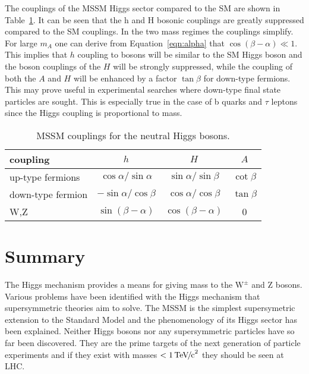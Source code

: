 The couplings of the MSSM Higgs sector compared to the SM are shown in Table~\ref{tab:MSSMcoupling}. It can be seen that the h and H bosonic couplings are greatly suppressed compared to the SM couplings. In the two mass regimes the couplings simplify. For large $m_{A}$ one can derive from Equation~\ref{eqn:alpha} that $\cos(\beta - \alpha) \ll 1$. This implies that $h$ coupling to bosons will be similar to the SM Higgs boson and the boson couplings of the $H$ will be strongly suppressed, while the coupling of both the $A$ and $H$ will be enhanced by a factor $\tan{\beta}$ for down-type fermions. This may prove useful in experimental searches where down-type final state particles are sought. This is especially true in the case of  b quarks and $\tau$ leptons since the Higgs coupling is proportional to mass.

\begin{table}[tbp]
	\centering
	\begin{tabular}{|l|c|c|c|}
	\hline
	coupling & $h$ & $H$ & $A$ \\ \hline
	up-type fermions & $\cos{\alpha} / \sin{\alpha}$ & $\sin{\alpha} / \sin{\beta}$ & $\cot{\beta}$ \\ \hline
	down-type fermion & $- \sin{\alpha} / \cos{\beta}$ & $\cos{\alpha} / \cos{\beta}$ & $\tan{\beta}$ \\ \hline
	W,Z & $\sin{(\beta - \alpha)}$ & $\cos{(\beta - \alpha)}$ & 0 \\ \hline
	\end{tabular}
\caption{MSSM couplings for the neutral Higgs bosons.\label{tab:MSSMcoupling}}
\end{table}

\section{Summary}
The Higgs mechanism provides a means for giving mass to the $\mathrm{W^{\pm}}$ and Z bosons. Various problems have been identified with the Higgs mechanism that supersymmetric theories aim to solve. The MSSM is the simplest supersymetric extension to the Standard Model and the phenomenology of its Higgs sector has been explained. Neither Higgs bosons nor any supersymmetric particles have so far been discovered. They are the prime targets of the next generation of particle experiments and if they exist with masses $< 1{\,\mathrm{Te\hspace{-.08em}V\hspace{-0.16em}/\hspace{-0.08em}c}^\mathrm{2}}$ they should be seen at LHC.